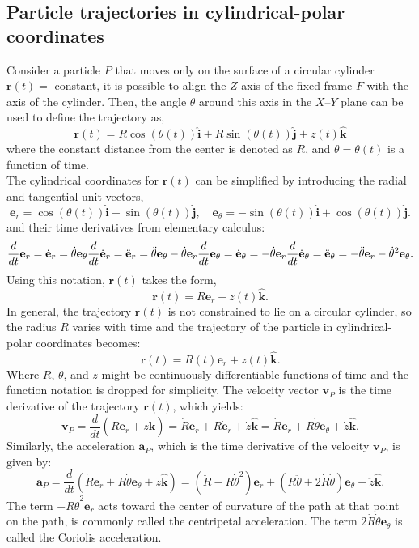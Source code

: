 \subsection{Particle trajectories in cylindrical-polar coordinates}
Consider a particle $P$ that moves only on the surface of a circular cylinder $\mathbf{r}(t) =$  constant, it is possible to align the $Z$ axis of the fixed frame $F$ with the axis of the cylinder. Then, the angle $\theta$ around this axis in the $X–Y$ plane can be used to define the trajectory as,
\[
\mathbf{r}(t) = R\cos(\theta(t))\hat{\mathbf{i}} + R\sin(\theta(t))\hat{\mathbf{j} } + z(t)\hat{\mathbf{k}}
\]
where the constant distance from the center is denoted as $R$, and $\theta = \theta(t)$ is a function of time.\\
The cylindrical coordinates for $\mathbf{r}(t)$ can be simplified by introducing the radial and tangential unit vectors,
\[
\mathbf{e}_r = \cos(\theta(t))\hat{\mathbf{i}} + \sin(\theta(t))\hat{\mathbf{j}}, \quad \mathbf{e}_\theta = -\sin(\theta(t))\hat{\mathbf{i}} + \cos(\theta(t))\hat{\mathbf{j}}.
\]
and their time derivatives from elementary calculus:
\[
\frac{d}{dt}\mathbf{e}_r = \dot{\mathbf{e}}_r = \dot{\theta}\mathbf{e}_\theta
\\
\frac{d}{dt}\dot{\mathbf{e}}_r = \ddot{\mathbf{e}}_r = \ddot{\theta}\mathbf{e}_\theta - \dot{\theta}\mathbf{e}_r
\\
\frac{d}{dt}\mathbf{e}_\theta = \dot{\mathbf{e}}_\theta = -\dot{\theta}\mathbf {e} _{r}
\\
\frac{d}{dt}\dot{\mathbf{e}}_\theta = \ddot{\mathbf{e}}_\theta = -\ddot{\theta}\mathbf{e}_r - \dot{\theta}^2\mathbf{e}_\theta.
\]
Using this notation, $\mathbf{r}(t)$ takes the form,
\[
\mathbf{r}(t) = R\mathbf{e}_r + z(t)\hat{\mathbf{k}}.
\]
In general, the trajectory $\mathbf{r}(t)$ is not constrained to lie on a circular cylinder, so the radius $R$ varies with time and the trajectory of the particle in cylindrical-polar coordinates becomes:
\[
\mathbf{r}(t) = R(t)\mathbf{e}_r + z(t)\hat{\mathbf{k}}.
\]
Where $R$, $\theta$, and $z$ might be continuously differentiable functions of time and the function notation is dropped for simplicity. The velocity vector $\mathbf{v}_P$ is the time derivative of the trajectory $\mathbf{r}(t)$, which yields:
\[
\mathbf{v}_P = \frac{d}{dt}\left(R\mathbf{e}_r + z\hat{\mathbf{k}}\right) = \dot{R}\mathbf{e}_r + R\dot{\mathbf{e}}_r + \dot{z}\hat{\mathbf{k}} = \dot{R}\mathbf{e}_r + R\dot{\theta}\mathbf{e}_\theta + \dot{z}\hat{\mathbf{k}}.
\]
Similarly, the acceleration $\mathbf{a}_P$, which is the time derivative of the velocity $\mathbf{v}_P$, is given by:
\[
\mathbf{a}_P = \frac{d}{dt}\left(\dot {R}\mathbf{e} _r + R\dot{\theta}\mathbf{e}_\theta  + \dot{z}\hat{\mathbf{k}}\right) = \left(\ddot {R} - R\dot{\theta}^2\right)\mathbf{e} _r + \left(R\ddot{\theta} + 2\dot{R}\dot{\theta}\right)\mathbf{e}_\theta + \ddot{z}\hat {\mathbf{k}}.
\]
The term $-R\dot{\theta}^2\mathbf{e}_r$ acts toward the center of curvature of the path at that point on the path, is commonly called the centripetal acceleration. The term $2\dot{R}\dot{\theta}\mathbf{e}_{\theta}$ is called the Coriolis acceleration.
\\\\
